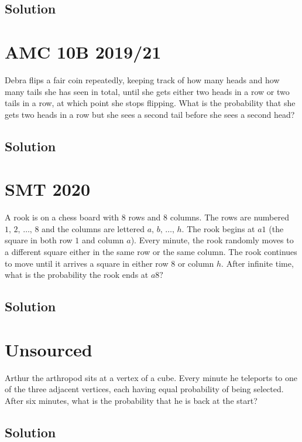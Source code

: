 \documentclass[mast]{lucky}
\begin{document}
\subsection{Solution}

\pagebreak\section{AMC 10B 2019/21} Debra flips a fair coin repeatedly, keeping track of how many heads and how many tails she has seen in total, until she gets either two heads in a row or two tails in a row, at which point she stops flipping. What is the probability that she gets two heads in a row but she sees a second tail before she sees a second head?
\subsection{Solution}




\pagebreak\section{SMT 2020} A rook is on a chess board with $8$ rows and $8$ columns. The rows are numbered $1,\, 2,\, \ldots,\, 8$ and the columns are lettered $a,\, b,\, \ldots,\, h.$ The rook begins at $a1$ (the square in both row $1$ and column $a$). Every minute, the rook randomly moves to a different square either in the same row or the same column. The rook continues to move until it arrives a square in either row $8$ or column $h.$ After infinite time, what is the probability the rook ends at $a8?$
\subsection{Solution}




\pagebreak\section{Unsourced}{Arthur the arthropod sits at a vertex of a cube.  Every minute he teleports to one of the three adjacent vertices, each having equal probability of being selected.  After six minutes, what is the probability that he is back at the start?}
\subsection{Solution}
\end{document}
